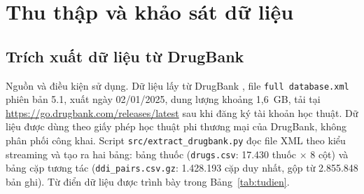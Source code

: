 \documentclass[12pt,a4paper,oneside]{report}
\begin{document}
\section{Thu thập và khảo sát dữ liệu}
\label{sec:dulieu}

\subsection{Trích xuất dữ liệu từ DrugBank}

Nguồn và điều kiện sử dụng. Dữ liệu lấy từ DrugBank \cite{wishart2018},
file \texttt{full database.xml} phiên bản 5.1, xuất ngày 02/01/2025, dung lượng
khoảng 1,6~GB, tải tại \url{https://go.drugbank.com/releases/latest} sau khi đăng
ký tài khoản học thuật. Dữ liệu được dùng theo giấy phép học thuật phi thương mại
của DrugBank, không phân phối công khai. Script \texttt{src/extract\_drugbank.py}
đọc file XML theo kiểu streaming và tạo ra hai bảng: bảng thuốc
(\texttt{drugs.csv}: 17.430 thuốc $\times$ 8 cột) và bảng cặp tương tác
(\texttt{ddi\_pairs.csv.gz}: 1.428.193 cặp duy nhất, gộp từ 2.855.848 bản ghi).
Từ điển dữ liệu được trình bày trong Bảng~\ref{tab:tudien}.
\end{document}
